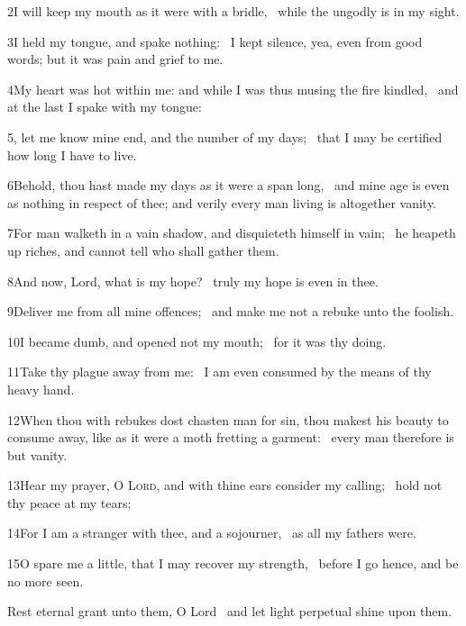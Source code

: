 2\enspace I will keep my mouth as it were with a bridle, \star\ while the ungodly is in my sight.

3\enspace I held my tongue, and spake nothing: \star\ I kept silence, yea, even from good words; but it was pain and grief to me.

4\enspace My heart was hot within me: and while I was thus musing the fire kindled, \star\ and at the last I spake with my tongue:

5, let me know mine end, and the number of my days; \star\ that I may be certified how long I have to live.

6\enspace Behold, thou hast made my days as it were a span long, \star\ and mine age is even as nothing in respect of thee; and verily every man living is altogether vanity.

7\enspace For man walketh in a vain shadow, and disquieteth himself in vain; \star\ he heapeth up riches, and cannot tell who shall gather them.

8\enspace And now, Lord, what is my hope? \star\ truly my hope is even in thee.

9\enspace Deliver me from all mine offences; \star\ and make me not a rebuke unto the foolish.

10\enspace I became dumb, and opened not my mouth; \star\ for it was thy doing.

11\enspace Take thy plague away from me: \star\ I am even consumed by the means of thy heavy hand.

12\enspace When thou with rebukes dost chasten man for sin, thou makest his beauty to consume away, like as it were a moth fretting a garment: \star\ every man therefore is but vanity.

13\enspace Hear my prayer, O {\scshape Lord}, and with thine ears consider my calling; \star\ hold not thy peace at my tears;

14\enspace For I am a stranger with thee, and a sojourner, \star\ as all my fathers were.

15\enspace O spare me a little, that I may recover my strength, \star\ before I go hence, and be no more seen.

Rest eternal grant unto them, O Lord \star\ and let light perpetual shine upon them.

\subsection[{Psalm 90}]{}

